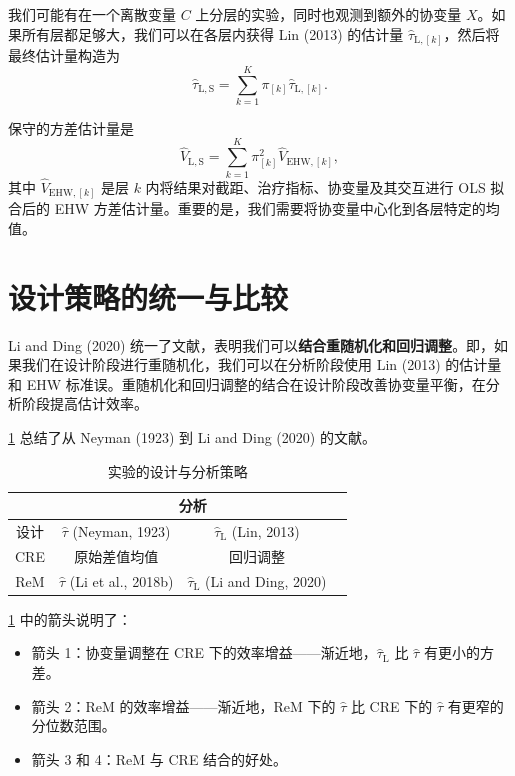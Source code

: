 我们可能有在一个离散变量 $C$ 上分层的实验，同时也观测到额外的协变量 $X$。如果所有层都足够大，我们可以在各层内获得 Lin (2013) 的估计量 $\hat{\tau}_{\mathrm{L},[k]}$，然后将最终估计量构造为
\[
\hat{\tau}_{\mathrm{L},\mathrm{S}} = \sum_{k=1}^K \pi_{[k]} \hat{\tau}_{\mathrm{L},[k]} .
\]

保守的方差估计量是
\[
\hat{V}_{\mathrm{L},\mathrm{S}} = \sum_{k=1}^K \pi_{[k]}^2 \hat{V}_{\mathrm{EHW},[k]} ,
\]
其中 $\hat{V}_{\mathrm{EHW},[k]}$ 是层 $k$ 内将结果对截距、治疗指标、协变量及其交互进行 OLS 拟合后的 EHW 方差估计量。重要的是，我们需要将协变量中心化到各层特定的均值。

\section{设计策略的统一与比较}\label{sec:6-unification}

Li and Ding (2020) 统一了文献，表明我们可以\textbf{结合重随机化和回归调整}。即，如果我们在设计阶段进行重随机化，我们可以在分析阶段使用 Lin (2013) 的估计量和 EHW 标准误。重随机化和回归调整的结合在设计阶段改善协变量平衡，在分析阶段提高估计效率。

\cref{tab:6-design-analysis} 总结了从 Neyman (1923) 到 Li and Ding (2020) 的文献。

\begin{table}[htbp]
\centering
\caption{实验的设计与分析策略}\label{tab:6-design-analysis}
\begin{tabular}{c|c|c|c}
\hline
 & \multicolumn{2}{c}{分析} \\
\hline
设计 & $\hat{\tau}$ (Neyman, 1923) & $\hat{\tau}_{\mathrm{L}}$ (Lin, 2013) \\
\hline
CRE & 原始差值均值 & 回归调整 \\
\hline
ReM & $\hat{\tau}$ (Li et al., 2018b) & $\hat{\tau}_{\mathrm{L}}$ (Li and Ding, 2020) \\
\hline
\end{tabular}
\end{table}

\cref{tab:6-design-analysis} 中的箭头说明了：
\begin{itemize}
  \item 箭头 1：协变量调整在 CRE 下的效率增益——渐近地，$\hat{\tau}_{\mathrm{L}}$ 比 $\hat{\tau}$ 有更小的方差。
  \item 箭头 2：ReM 的效率增益——渐近地，ReM 下的 $\hat{\tau}$ 比 CRE 下的 $\hat{\tau}$ 有更窄的分位数范围。
  \item 箭头 3 和 4：ReM 与 CRE 结合的好处。
\end{itemize}

